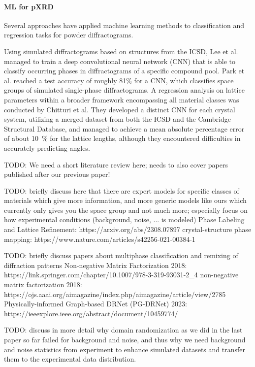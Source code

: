 \paragraph{ML for pXRD} Several approaches have applied machine learning methods to classification and regression tasks for powder diffractograms.

Using simulated diffractograms based on structures from the ICSD, Lee et al. managed to train a deep convolutional neural network (CNN) that is able to classify occurring phases in diffractograms of a specific compound pool. \cite{Lee2020}
Park et al. reached a test accuracy of roughly 81\% for a CNN, which classifies space groups of simulated single-phase diffractograms. \cite{Park2017}
A regression analysis on lattice parameters within a broader framework encompassing all material classes was conducted by Chitturi et al.\cite{chitturi_automated_2021} They developed a distinct CNN for each crystal system, utilizing a merged dataset from both the ICSD and the Cambridge Structural Database, and managed to achieve a mean absolute percentage error of about \SI{10}{\percent} for the lattice lengths, although they encountered difficulties in accurately predicting angles.

TODO: We need a short literature review here; needs to also cover papers published after our previous paper!

TODO: briefly discuss here that there are expert models for specific classes of materials which give more information, and more generic models like ours which currently only gives you the space group and not much more; especially focus on how experimental conditions (background, noise, ... is modeled)
Phase Labeling and Lattice Refinement: https://arxiv.org/abs/2308.07897
crystal-structure phase mapping: https://www.nature.com/articles/s42256-021-00384-1


TODO: briefly discuss papers about multiphase classification and remixing of diffraction patterns
Non-negative Matrix Factorization 2018: https://link.springer.com/chapter/10.1007/978-3-319-93031-2_4
non-negative matrix factorization 2018: https://ojs.aaai.org/aimagazine/index.php/aimagazine/article/view/2785
Physically-informed Graph-based DRNet (PG-DRNet) 2023: https://ieeexplore.ieee.org/abstract/document/10459774/

TODO: discuss in more detail why domain randomization as we did in the last paper so far failed for background and noise, and thus why we need background and noise statistics from experiment to enhance simulated datasets and transfer them to the experimental data distribution.